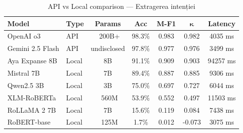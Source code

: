 \begin{table}[H]
\centering
\footnotesize
\caption{API vs Local comparison — Extragerea intenției}
\label{tab:api-vs-local-intent-extraction}
\begin{tabular}{llccccc}
\toprule
\textbf{Model} & \textbf{Type} & \textbf{Params} & \textbf{Acc} & \textbf{M-F1} & $\boldsymbol{\kappa}$ & \textbf{Latency} \\
\midrule
OpenAI o3 & API & ~200B+ & 98.3\% & 0.983 & 0.982 & 4035 ms \\
Gemini 2.5 Flash & API & undisclosed & 97.8\% & 0.977 & 0.976 & 3499 ms \\
Aya Expanse 8B & Local & 8B & 91.1\% & 0.909 & 0.903 & 94257 ms \\
Mistral 7B & Local & 7B & 89.4\% & 0.887 & 0.885 & 9306 ms \\
Qwen2.5 3B & Local & 3B & 75.0\% & 0.697 & 0.727 & 6044 ms \\
XLM-RoBERTa & Local & ~560M & 53.9\% & 0.552 & 0.497 & 11503 ms \\
RoLLaMA 2 7B & Local & 7B & 15.6\% & 0.119 & 0.084 & 7438 ms \\
RoBERT-base & Local & ~125M & 1.7\% & 0.012 & -0.073 & 3075 ms \\
\bottomrule
\end{tabular}
\end{table}